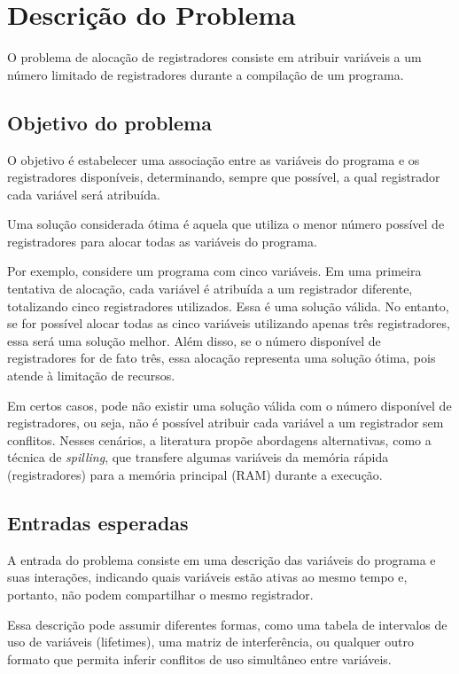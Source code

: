 \section{Descrição do Problema}

O problema de alocação de registradores consiste em atribuir variáveis a um número limitado de registradores durante a compilação de um programa.

\subsection{Objetivo do problema}

O objetivo é estabelecer uma associação entre as variáveis do programa e os registradores disponíveis,
determinando, sempre que possível, a qual registrador cada variável será atribuída.

Uma solução considerada ótima é aquela que utiliza o menor número possível de registradores para
alocar todas as variáveis do programa.

Por exemplo, considere um programa com cinco variáveis. Em uma primeira tentativa de alocação, cada variável é atribuída
a um registrador diferente, totalizando cinco registradores utilizados. Essa é uma solução válida.
No entanto, se for possível alocar todas as cinco variáveis utilizando apenas três registradores,
essa será uma solução melhor. Além disso, se o número disponível de registradores for de fato três,
essa alocação representa uma solução ótima, pois atende à limitação de recursos.

Em certos casos, pode não existir uma solução válida com o número disponível de registradores, ou seja, não é possível
atribuir cada variável a um registrador sem conflitos. Nesses cenários, a literatura propõe abordagens alternativas,
como a técnica de \textit{spilling}, que transfere algumas variáveis da memória rápida (registradores) para
a memória principal (RAM) durante a execução.

\subsection{Entradas esperadas}

A entrada do problema consiste em uma descrição das variáveis do programa e suas interações,
indicando quais variáveis estão ativas ao mesmo tempo e, portanto, não podem compartilhar o mesmo registrador.

Essa descrição pode assumir diferentes formas, como uma tabela de intervalos de uso de variáveis (lifetimes),
uma matriz de interferência, ou qualquer outro formato que permita inferir conflitos de uso simultâneo entre variáveis.


